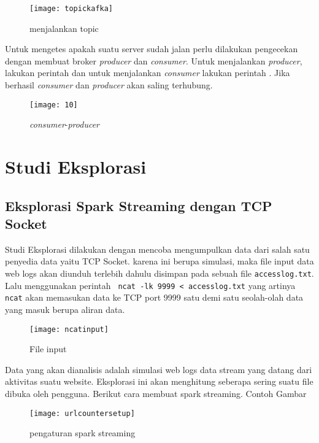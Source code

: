 \begin{figure}[H] 
	\centering  
	\texttt{[image: topickafka]}  
	\caption[Gambar menjalankan topic]{menjalankan topic} 
	\label{fig:topic-run} 
\end{figure}

Untuk mengetes apakah suatu server sudah jalan perlu dilakukan pengecekan dengan membuat broker \textit{producer} dan \textit{consumer}. Untuk menjalankan \textit{producer}, lakukan perintah  dan untuk menjalankan \textit{consumer} lakukan perintah . Jika berhasil \textit{consumer} dan \textit{producer} akan saling terhubung.

\begin{figure}[H] 
	\centering  
	\texttt{[image: 10]}  
	\caption[Gambar \textit{consumer}-\textit{producer}]{\textit{consumer}-\textit{producer}} 
	\label{fig:topic-run} 
\end{figure}


\section{Studi Eksplorasi}
\subsection{Eksplorasi Spark Streaming dengan TCP Socket}
Studi Eksplorasi dilakukan dengan mencoba mengumpulkan data dari salah satu penyedia data yaitu TCP Socket. karena ini berupa simulasi, maka file input data web logs akan diunduh terlebih dahulu disimpan pada sebuah file \texttt{accesslog.txt}. Lalu menggunakan perintah \texttt{ ncat -lk 9999 < accesslog.txt} yang artinya \texttt{ncat} akan memasukan data ke TCP port 9999 satu demi satu seolah-olah data yang masuk berupa aliran data.

\begin{figure}[H] 
	\centering  
	\texttt{[image: ncatinput]}  
	\caption[Gambar File input]{File input} 
	\label{fig:Output-Log-Parser} 
\end{figure}

Data yang akan dianalisis adalah simulasi web logs data stream yang datang dari aktivitas suatu website. Eksplorasi ini akan menghitung seberapa sering suatu file dibuka oleh pengguna. Berikut
cara membuat spark streaming. Contoh Gambar
  
\begin{figure}[H] 
	\centering  
	\texttt{[image: urlcountersetup]}  
	\caption[Gambar pengaturan spark streaming]{pengaturan spark streaming} 
	\label{fig:Output-Log-Parser} 
\end{figure}


